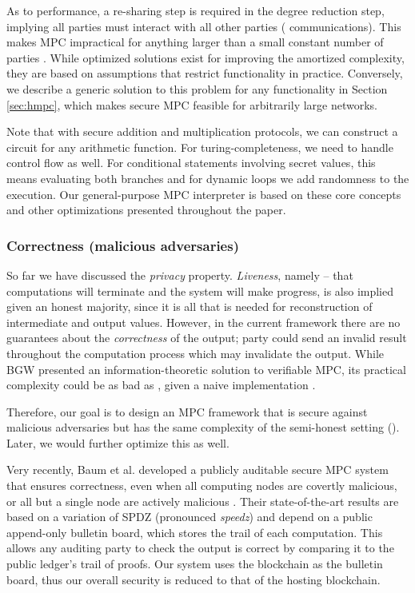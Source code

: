 \documentclass{article} \usepackage{nips13submit_e,times}
\begin{document}
As to performance, a re-sharing step is required in the degree reduction step, implying all parties must interact with all other parties ( communications). This makes MPC impractical for anything larger than a small constant number of parties . While optimized solutions exist for improving the amortized complexity, they are based on assumptions that restrict functionality in practice. Conversely, we describe a generic solution to this problem for any functionality in Section \ref{sec:hmpc}, which makes secure MPC feasible for arbitrarily large networks.

Note that with secure addition and multiplication protocols, we can construct a circuit for any arithmetic function. For turing-completeness, we need to handle control flow as well. For conditional statements involving secret values, this means evaluating both branches and for dynamic loops we add randomness to the execution. Our general-purpose MPC interpreter is based on these core concepts and other optimizations presented throughout the paper.



\subsubsection{Correctness (malicious adversaries)}
\label{sec:comp_correct}

So far we have discussed the \textit{privacy} property. \textit{Liveness}, namely -- that computations will terminate and the system will make progress, is also implied given an honest majority, since it is all that is needed for reconstruction of intermediate and output values. However, in the current framework there are no guarantees about the \textit{correctness} of the output; party  could send an invalid result throughout the computation process which may invalidate the output. While BGW \cite{GBW88} presented an information-theoretic solution to verifiable MPC, its practical complexity could be as bad as , given a naive implementation \cite{TODO}.

Therefore, our goal is to design an MPC framework that is secure against malicious adversaries but has the same complexity of the semi-honest setting (). Later, we would further optimize this as well.

Very recently, Baum et al. developed a publicly auditable secure MPC system that ensures correctness, even when all computing nodes are covertly malicious, or all but a single node are actively malicious \cite{baum14}. Their state-of-the-art results are based on a variation of SPDZ (pronounced \textit{speedz}) \cite{spdz} and depend on a public append-only bulletin board, which stores the trail of each computation. This allows any auditing party to check the output is correct by comparing it to the public ledger's trail of proofs. Our system uses the blockchain as the bulletin board, thus our overall security is reduced to that of the hosting blockchain.
\end{document}
